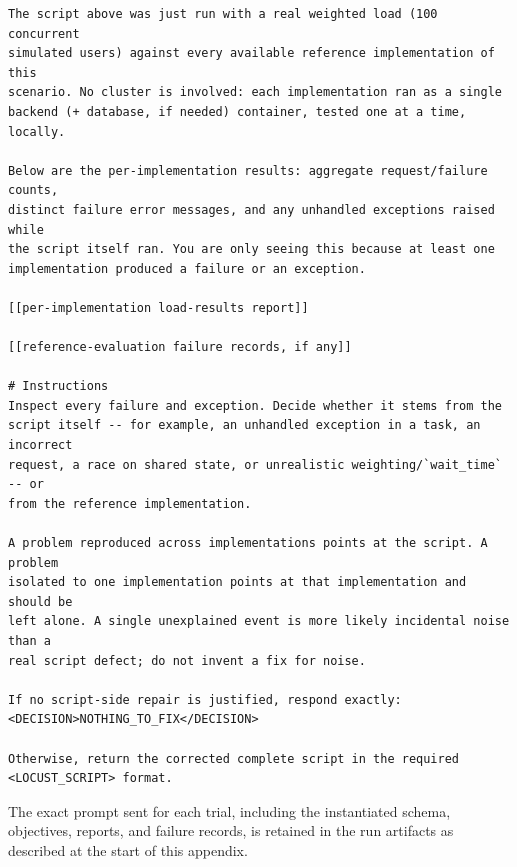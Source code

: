 \small
\begin{verbatim}
The script above was just run with a real weighted load (100 concurrent
simulated users) against every available reference implementation of this
scenario. No cluster is involved: each implementation ran as a single
backend (+ database, if needed) container, tested one at a time, locally.

Below are the per-implementation results: aggregate request/failure counts,
distinct failure error messages, and any unhandled exceptions raised while
the script itself ran. You are only seeing this because at least one
implementation produced a failure or an exception.

[[per-implementation load-results report]]

[[reference-evaluation failure records, if any]]

# Instructions
Inspect every failure and exception. Decide whether it stems from the
script itself -- for example, an unhandled exception in a task, an incorrect
request, a race on shared state, or unrealistic weighting/`wait_time` -- or
from the reference implementation.

A problem reproduced across implementations points at the script. A problem
isolated to one implementation points at that implementation and should be
left alone. A single unexplained event is more likely incidental noise than a
real script defect; do not invent a fix for noise.

If no script-side repair is justified, respond exactly:
<DECISION>NOTHING_TO_FIX</DECISION>

Otherwise, return the corrected complete script in the required
<LOCUST_SCRIPT> format.
\end{verbatim}
\normalsize

The exact prompt sent for each trial, including the instantiated schema,
objectives, reports, and failure records, is retained in the run artifacts as
described at the start of this appendix.
